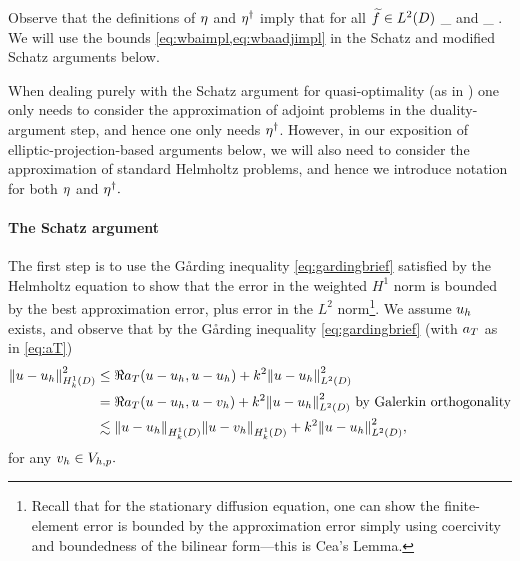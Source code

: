 Observe that the definitions of $\eta$ and $\eta^{\dagger}$ imply that for all $\ftilde \in \LtD$
\beq\label{eq:wbaimpl}
\inf_{\vh \in \Vhp} \NHokD{\solfem(\ftilde) - \vh} \leq \wba \NLtD{\ftilde}
\eeq
and
\beq\label{eq:wbaadjimpl}
\inf_{\vh \in \Vhp} \NHokD{\solfems(\ftilde) - \vh} \leq \wbaadj \NLtD{\ftilde}.
\eeq
We will use the bounds \cref{eq:wbaimpl,eq:wbaadjimpl} in the Schatz and modified Schatz arguments below.

 When dealing purely with the Schatz argument for quasi-optimality (as in \cite[Section 2.2]{Sa:06}) one only needs to consider the approximation of adjoint problems in the duality-argument step, and hence one only needs $\eta^{\dagger}$. However, in our exposition of elliptic-projection-based arguments below, we will also need to consider the approximation of standard Helmholtz problems, and hence we introduce notation for both $\eta$ and $\eta^{\dagger}.$


 \paragraph{The Schatz argument} The first step is to use the G\r{a}rding inequality \cref{eq:gardingbrief} satisfied by the Helmholtz equation to show that the error in the weighted $H^1$ norm is bounded by the best approximation error, plus error in the $L^2$ norm\footnote{Recall that for the stationary diffusion equation, one can show the finite-element error is bounded by the approximation error simply using coercivity and boundedness of the bilinear form---this is Cea's Lemma.}. We assume $u_{h}$ exists, and observe that by the G\r{a}rding inequality \cref{eq:gardingbrief} (with $a_{T}$ as in \cref{eq:aT})
\begin{align}
\NHokD{u-\uh}^2 &\leq \Re{\aT(u-\uh,u-\uh)} + k^2 \NLtD{u-\uh}^2\nonumber\\
&= \Re{\aT(u-\uh,u-\vh)} + k^2 \NLtD{u-\uh}^2\text{ by Galerkin orthogonality}\nonumber\\
&\lesssim \NHokD{u-\uh}\NHokD{u-\vh} + k^2 \NLtD{u-\uh}^2,\label{eq:gardingerror}
\end{align}
for any $v_{h} \in V_{h,p}.$

